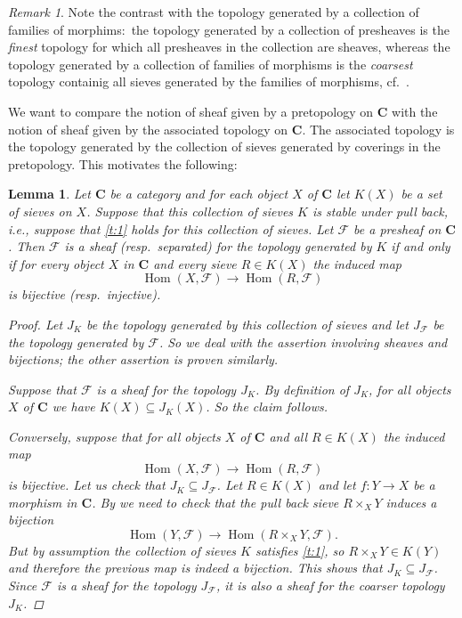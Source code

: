 \documentclass[12pt,reqno,a4paper]{amsart}
\theoremstyle{plain}
\newtheorem{lm}[thm]{Lemma}
\theoremstyle{definition}
\theoremstyle{remark}
\newtheorem{rem}[thm]{Remark}
\begin{document}
\begin{rem}
  Note the contrast with the topology generated by a collection of families of morphims:~the topology generated by a collection of presheaves is the \textit{finest} topology for which all presheaves in the collection are sheaves, whereas the topology generated by a collection of families of morphisms is the \textit{coarsest} topology containig all sieves generated by the families of morphisms, cf.~.
\end{rem}

We want to compare the notion of sheaf given by a pretopology on $\mathbf{C}$ with the notion of sheaf given by the associated topology on $\mathbf{C}$.
The associated topology is the topology generated by the collection of sieves generated by coverings in the pretopology.
This motivates the following:

\begin{lm}\label{lm:generated}
  Let $\mathbf{C}$ be a category and for each object $X$ of $\mathbf{C}$ let $K(X)$ be a set of sieves on $X$.
  Suppose that this collection of sieves $K$ is stable under pull back, i.e., suppose that \ref{t:1} holds for this collection of sieves.
  Let $\mathscr{F}$ be a presheaf on $\mathbf{C}$.
  Then $\mathscr{F}$ is a sheaf (resp.~separated) for the topology generated by $K$ if and only if for every object $X$ in $\mathbf{C}$ and every sieve $R \in K(X)$ the induced map
  \[ \operatorname{Hom}(X,\mathscr{F}) \to \operatorname{Hom}(R,\mathscr{F}) \]
  is bijective (resp.~injective).
  \begin{proof}
    Let $J_{K}$ be the topology generated by this collection of sieves and let $J_{\mathscr{F}}$ be the topology generated by $\mathscr{F}$.
    So we deal with the assertion involving sheaves and bijections; the other assertion is proven similarly.

    Suppose that $\mathscr{F}$ is a sheaf for the topology $J_{K}$.
    By definition of $J_{K}$, for all objects $X$ of $\mathbf{C}$ we have $K(X) \subseteq J_{K}(X)$.
    So the claim follows.

    Conversely, suppose that for all objects $X$ of $\mathbf{C}$ and all $R \in K(X)$ the induced map
    \[ \operatorname{Hom}(X,\mathscr{F}) \to \operatorname{Hom}(R,\mathscr{F}) \]
    is bijective.
    Let us check that $J_{K} \subseteq J_{\mathscr{F}}$.
    Let $R \in K(X)$ and let $f \colon Y \to X$ be a morphism in $\mathbf{C}$.
    By  we need to check that the pull back sieve $R \times_{X} Y$ induces a bijection
    \[ \operatorname{Hom}(Y,\mathscr{F}) \to \operatorname{Hom}(R \times_{X} Y, \mathscr{F}). \]
    But by assumption the collection of sieves $K$ satisfies \ref{t:1}, so $R \times_{X} Y \in K(Y)$ and therefore the previous map is indeed a bijection.
    This shows that $J_{K} \subseteq J_{\mathscr{F}}$.
    Since $\mathscr{F}$ is a sheaf for the topology $J_{\mathscr{F}}$, it is also a sheaf for the coarser topology $J_{K}$.
  \end{proof}
\end{lm}
\end{document}
